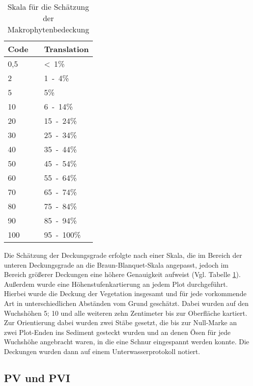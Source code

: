 \begin{table}[h]{\textwidth}
\centering
\caption{Skala für die Schätzung der Makrophytenbedeckung}
\begin{tabular}{lll}
\toprule
Code	&& Translation\\
\midrule
0,5	 	&& \unit{<1}{\%} \\
2 		&& \unit{1-4}{\%} \\
5 		&& \unit{5}{\%}\\
\midrule
10 		&& \unit{6-14}{\%}\\
20 		&& \unit{15-24}{\%}\\
30 		&& \unit{25-34}{\%}\\
40		&& \unit{35-44}{\%}\\
50		&& \unit{45-54}{\%}\\
\midrule
60		&& \unit{55-64}{\%}\\
70		&& \unit{65-74}{\%}\\
80		&& \unit{75-84}{\%}\\
90		&& \unit{85-94}{\%}\\
100		&& \unit{95-100}{\%}\\
\bottomrule
\end{tabular}
\label{Deckung}
\end{table}



Die Schätzung der Deckungsgrade erfolgte nach einer Skala, die im Bereich der unteren Deckungsgrade an die Braun-Blanquet-Skala angepasst, jedoch im Bereich größerer Deckungen eine höhere Genauigkeit aufweist (Vgl. Tabelle \ref{Deckung}).\\
Außerdem wurde eine Höhenstufenkartierung an jedem Plot durchgeführt. Hierbei wurde die Deckung der Vegetation insgesamt und für jede vorkommende Art in unterschiedlichen Abständen vom Grund geschätzt. Dabei wurden auf den Wuchshöhen \unit{5}{\centi\metre}; \unit{10}{\centi\metre} und alle weiteren zehn Zentimeter bis zur Oberfläche kartiert. Zur Orientierung dabei wurden zwei Stäbe gesetzt, die bis zur Null-Marke an zwei Plot-Enden ins Sediment gesteckt wurden und an denen Ösen für jede Wuchshöhe angebracht waren, in die eine Schnur eingespannt werden konnte. Die Deckungen wurden dann auf einem Unterwasserprotokoll notiert.\\






\subsection{PV und PVI}

